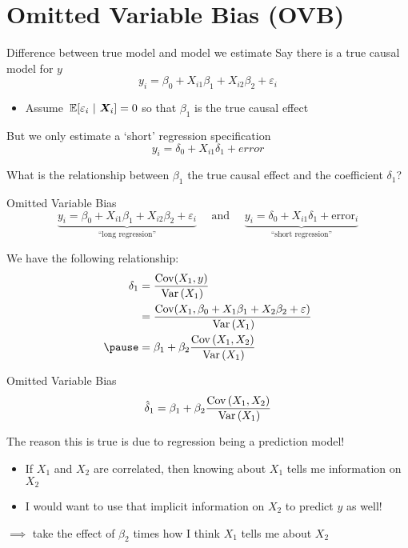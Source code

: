 \documentclass[aspectratio=169,t,11pt,table]{beamer}
\begin{document}



\section{Omitted Variable Bias (OVB)}

\begin{frame}{Difference between true model and model we estimate}
  Say there is a true causal model for $y$
  $$
    y_i = \beta_0 + X_{i1} \beta_1 + X_{i2} \beta_2 + \varepsilon_i
  $$
  \begin{itemize}
    \item Assume $\expec{\varepsilon_i}{\bm{X}_i} = 0$ so that $\beta_1$ is the true causal effect
  \end{itemize}
  
  \pause
  \bigskip
  But we only estimate a `short' regression specification
  $$
    y_i = \delta_0 + X_{i1} \delta_1 + error
  $$

  \bigskip
  What is the relationship between $\beta_1$ the true causal effect and the coefficient $\delta_1$?
\end{frame}

\begin{frame}{Omitted Variable Bias}
  \vspace*{-\bigskipamount}
  $$
    \underbrace{y_i = \beta_0 + X_{i1} \beta_1 + X_{i2} \beta_2 + \varepsilon_i}_{\text{``long regression''}} \quad\text{ and }\quad \underbrace{y_i = \delta_0 + X_{i1} \delta_1 + \text{error}_i}_{\text{``short regression''}}
  $$

  \bigskip
  We have the following relationship:
  \begin{align*}
    \delta_1 
    &= \frac{\cov(X_1, y)}{\var{X_1}} \\
    &= \frac{\cov(X_1, \beta_0 + X_{1} \beta_1 + X_{2} \beta_2 + \varepsilon)}{\var{X_1}} \\ \pause
    &= \beta_1 + \beta_2 \frac{\cov{X_1, X_2}}{\var{X_1}} 
  \end{align*}
\end{frame}

\begin{frame}{Omitted Variable Bias}
  $$
    \hat{\delta}_1 = \beta_1 + \beta_2 \frac{\cov{X_1, X_2}}{\var{X_1}} 
  $$

  \bigskip
  The reason this is true is due to regression being a prediction model!
  \begin{itemize}
    \item If $X_1$ and $X_2$ are correlated, then knowing about $X_1$ tells me information on $X_2$
    
    \item I would want to use that implicit information on $X_2$ to predict $y$ as well! 
  \end{itemize}

  \bigskip
  $\implies$ take the effect of $\beta_2$ times how I think $X_1$ tells me about $X_2$
\end{frame}
\end{document}
